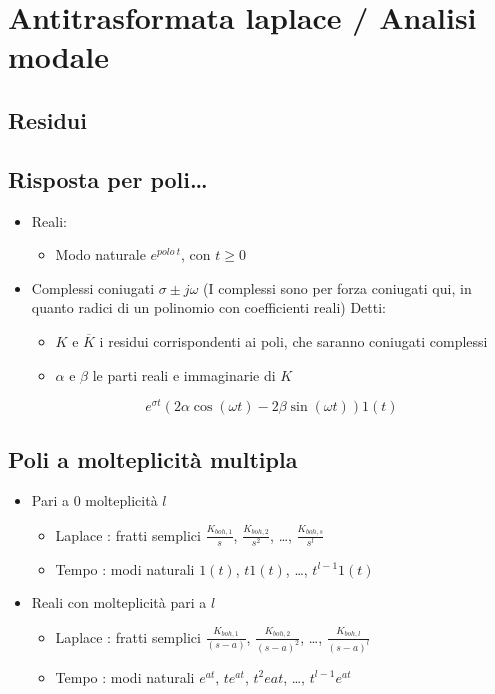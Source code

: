 \documentclass[11pt]{article}
\begin{document}
\section{Antitrasformata laplace / Analisi modale}
\label{sec:orge8458b1}
\subsection{Residui}
\label{sec:orgc9bb973}

\subsection{Risposta per poli\ldots{}}
\label{sec:orga21070b}
\begin{itemize}
\item Reali:
\begin{itemize}
\item Modo naturale \(e^{polo\ t}\), con \(t \geq 0\)
\end{itemize}
\item Complessi coniugati \(\sigma \pm j\omega\) (I complessi sono per forza coniugati qui, in
quanto radici di un polinomio con coefficienti reali)
 Detti:
\begin{itemize}
\item \(K\) e \(\overline{K}\) i residui corrispondenti ai poli, che saranno coniugati complessi
\item \(\alpha\) e \(\beta\) le parti reali e immaginarie di \(K\)
\end{itemize}
\[ e^{\sigma t} (2 \alpha \cos(\omega t) - 2 \beta \sin(\omega t)) 1(t) \]
\end{itemize}

\subsection{Poli a molteplicità multipla}
\label{sec:org845022e}
\begin{itemize}
\item Pari a 0 molteplicità \(l\)
\begin{itemize}
\item Laplace : fratti semplici \(\frac{K_{boh,1}}{s}\), \(\frac{K_{boh,2}}{s^2}\), \ldots{}, \(\frac{K_{boh,s}}{s^l}\)
\item Tempo : modi naturali \(1(t)\), \(t 1(t)\), \ldots{}, \(t^{l-1} 1(t)\)
\end{itemize}
\item Reali con molteplicità pari a \(l\)
\begin{itemize}
\item Laplace : fratti semplici \(\frac{K_{boh,1}}{(s-a)}\), \(\frac{K_{boh,2}}{(s-a)^2}\),
\ldots{}, \(\frac{K_{boh,l}}{(s-a)^l}\)
\item Tempo : modi naturali \(e^{at}\), \(t e^{at}\), \(t^2 e{at}\), \ldots{}, \(t^{l-1} e^{at}\)
\end{itemize}
\end{itemize}
\end{document}
